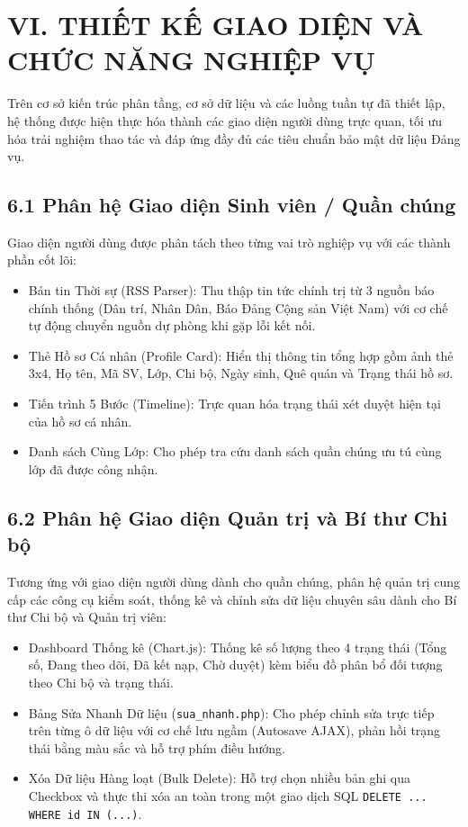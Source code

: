 \documentclass[12pt,a4paper]{report}
\begin{document}
\section*{VI. THIẾT KẾ GIAO DIỆN VÀ CHỨC NĂNG NGHIỆP VỤ}

Trên cơ sở kiến trúc phân tầng, cơ sở dữ liệu và các luồng tuần tự đã thiết lập, hệ thống được hiện thực hóa thành các giao diện người dùng trực quan, tối ưu hóa trải nghiệm thao tác và đáp ứng đầy đủ các tiêu chuẩn bảo mật dữ liệu Đảng vụ.

\subsection*{6.1 Phân hệ Giao diện Sinh viên / Quần chúng}
Giao diện người dùng được phân tách theo từng vai trò nghiệp vụ với các thành phần cốt lõi:
\begin{itemize}[label=--,leftmargin=*]
  \item Bản tin Thời sự (RSS Parser): Thu thập tin tức chính trị từ 3 nguồn báo chính thống (Dân trí, Nhân Dân, Báo Đảng Cộng sản Việt Nam) với cơ chế tự động chuyển nguồn dự phòng khi gặp lỗi kết nối.
  \item Thẻ Hồ sơ Cá nhân (Profile Card): Hiển thị thông tin tổng hợp gồm ảnh thẻ 3x4, Họ tên, Mã SV, Lớp, Chi bộ, Ngày sinh, Quê quán và Trạng thái hồ sơ.
  \item Tiến trình 5 Bước (Timeline): Trực quan hóa trạng thái xét duyệt hiện tại của hồ sơ cá nhân.
  \item Danh sách Cùng Lớp: Cho phép tra cứu danh sách quần chúng ưu tú cùng lớp đã được công nhận.
\end{itemize}

\subsection*{6.2 Phân hệ Giao diện Quản trị và Bí thư Chi bộ}
Tương ứng với giao diện người dùng dành cho quần chúng, phân hệ quản trị cung cấp các công cụ kiểm soát, thống kê và chỉnh sửa dữ liệu chuyên sâu dành cho Bí thư Chi bộ và Quản trị viên:
\begin{itemize}[label=--,leftmargin=*]
  \item Dashboard Thống kê (Chart.js): Thống kê số lượng theo 4 trạng thái (Tổng số, Đang theo dõi, Đã kết nạp, Chờ duyệt) kèm biểu đồ phân bổ đối tượng theo Chi bộ và trạng thái.
  \item Bảng Sửa Nhanh Dữ liệu (\texttt{sua\_nhanh.php}): Cho phép chỉnh sửa trực tiếp trên từng ô dữ liệu với cơ chế lưu ngầm (Autosave AJAX), phản hồi trạng thái bằng màu sắc và hỗ trợ phím điều hướng.
  \item Xóa Dữ liệu Hàng loạt (Bulk Delete): Hỗ trợ chọn nhiều bản ghi qua Checkbox và thực thi xóa an toàn trong một giao dịch SQL \texttt{DELETE ... WHERE id IN (...)}.
\end{itemize}
\end{document}
